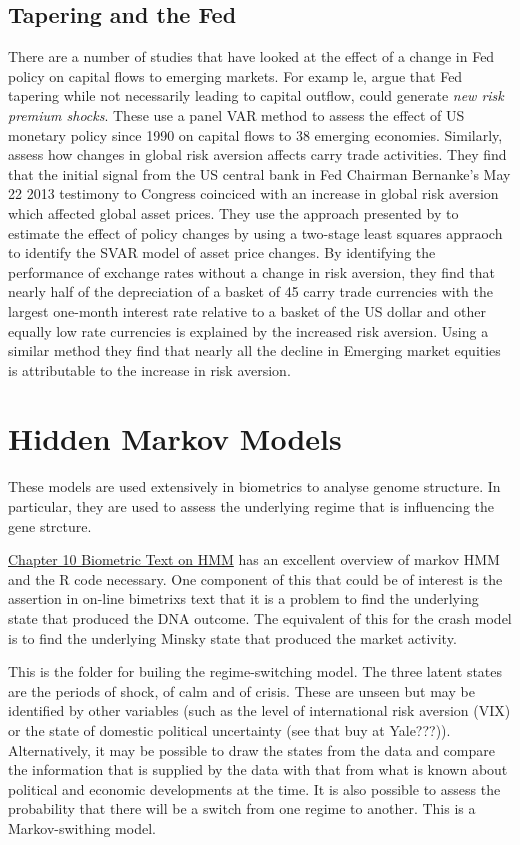 \documentclass[12pt, a4paper, oneside]{article} %
\begin{document}
\subsection{Tapering and the Fed}
There are a number of studies that have looked at the effect of a change in Fed policy on capital flows to emerging markets.  For examp le, \citep{IMFLatam} argue that Fed tapering while not necessarily leading to capital outflow, could generate \emph{new risk premium shocks}.  These use a panel VAR method to assess the effect of US monetary policy since 1990 on capital flows to 38 emerging economies.  Similarly, \citep{NYFedtaper} assess how changes in global risk aversion affects carry trade activities.  They find that the initial signal from the US central bank in Fed Chairman Bernanke's May 22 2013 testimony to Congress coinciced with an increase in global risk aversion which affected global asset prices. They use the approach presented by \citep{MertensSVAR} to estimate the effect of policy changes by using a two-stage least squares appraoch to identify the SVAR model of asset price changes.  By identifying the performance of exchange rates without a change in risk aversion, they find that nearly half of the depreciation of a basket of 45 carry trade currencies with the largest one-month interest rate relative to a basket of the US dollar and other equally low rate currencies is explained by the increased risk aversion. Using a similar method they find that nearly all the decline in Emerging market equities is attributable to the increase in risk aversion. 

\section{Hidden Markov Models}
These models are used extensively in biometrics to analyse genome structure.  In particular, they are used to assess the underlying regime that is influencing the gene strcture. 

\href{http://a-little-book-of-r-for-bioinformatics.readthedocs.org/en/latest/src/chapter10.html}{Chapter 10 Biometric Text on HMM}
has an excellent overview of markov HMM and the R code necessary. One component of this that could be of interest is the assertion in on-line bimetrixs text that it is a problem to find the underlying state that produced the DNA outcome.  The equivalent of this for the crash model is to find the underlying Minsky state that produced the market activity. 

This is the folder for builing the regime-switching model. The three latent states are the periods of shock, of calm and of crisis.  These are unseen but may be identified by other variables (such as the level of international risk aversion (VIX) or the state of domestic political uncertainty (see that buy at Yale???)).  Alternatively, it may be possible to draw the states from the data and compare the information that is supplied by the data with that from what is known about political and economic developments at the time.  It is also possible to assess the probability that there will be a switch from one regime to another.  This is a Markov-swithing model. 
\end{document}
